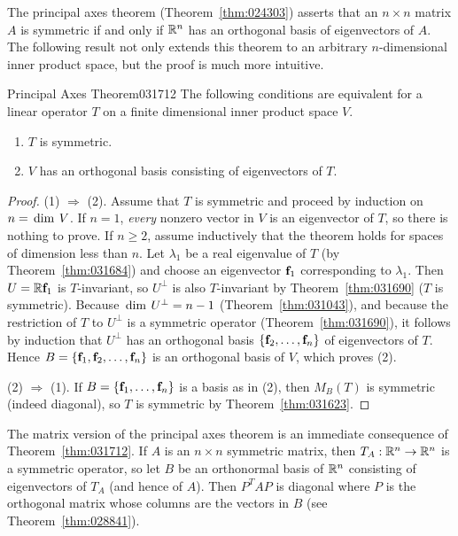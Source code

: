 The principal axes theorem (Theorem~\ref{thm:024303}) asserts that an $n \times n$ matrix $A$ is symmetric if and only if $\mathbb{R}^n$ has an orthogonal basis of eigenvectors of $A$. The following result not only extends this theorem to an arbitrary $n$-dimensional inner product space, but the proof is much more intuitive.

\begin{theorem}{Principal Axes Theorem}{031712}
The following conditions are equivalent for a linear operator $T$ on a finite dimensional inner product space $V$.

\begin{enumerate}
\item $T$ is symmetric.

\item $V$ has an orthogonal basis consisting of eigenvectors of $T$.
\end{enumerate}
\end{theorem}

\begin{proof}
(1) $\Rightarrow$ (2). Assume that $T$ is symmetric and proceed by induction on $n = \thinspace\operatorname{dim\medspace} V$. If $n = 1$, \textit{every} nonzero vector in $V$ is an eigenvector of $T$, so there is nothing to prove. If $n \geq 2$, assume inductively that the theorem holds for spaces of dimension less than $n$. Let $\lambda_{1}$ be a real eigenvalue of $T$ (by Theorem~\ref{thm:031684}) and choose an eigenvector $\textbf{f}_{1}$ corresponding to $\lambda_{1}$. Then $U = \mathbb{R}\textbf{f}_{1}$ is $T$-invariant, so $U^{\perp}$ is also $T$-invariant by Theorem~\ref{thm:031690} ($T$ is symmetric). Because $\thinspace\operatorname{dim\medspace} U^{\perp} = n - 1$ (Theorem~\ref{thm:031043}), and because the restriction of $T$ to $U^{\perp}$ is a symmetric operator (Theorem~\ref{thm:031690}), it follows by induction that $U^{\perp}$ has an orthogonal basis $\{\textbf{f}_{2}, \dots, \textbf{f}_{n}\}$ of eigenvectors of $T$. Hence $B = \{\textbf{f}_{1}, \textbf{f}_{2}, \dots, \textbf{f}_{n}\}$ is an orthogonal basis of $V$, which proves (2).

(2) $\Rightarrow$ (1). If $B = \{\textbf{f}_{1}, \dots, \textbf{f}_{n}\}$ is a basis as in (2), then $M_{B}(T)$ is symmetric (indeed diagonal), so $T$ is symmetric by Theorem~\ref{thm:031623}.
\end{proof}

The matrix version of the principal axes theorem is an immediate consequence of Theorem~\ref{thm:031712}. If $A$ is an $n \times n$ symmetric matrix, then $T_{A} : \mathbb{R}^n \to \mathbb{R}^n$ is a symmetric operator, so let $B$ be an orthonormal basis of $\mathbb{R}^n$ consisting of eigenvectors of $T_{A}$ (and hence of $A$). Then $P^{T}AP$ is diagonal where $P$ is the orthogonal matrix whose columns are the vectors in $B$ (see Theorem~\ref{thm:028841}).

